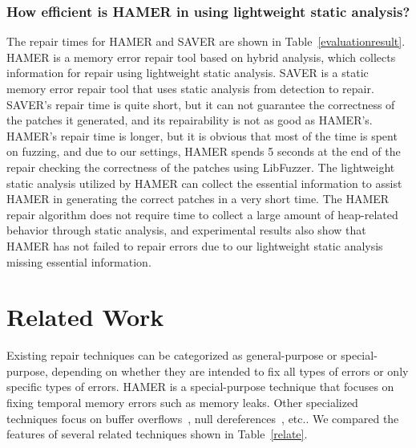 \documentclass[a4paper,11pt,oneside,openany]{book}
\begin{document}
\subsection[Research Question 3]{How efficient is HAMER in using lightweight static analysis?}
The repair times for HAMER and SAVER are shown in Table~\ref{evaluationresult}. HAMER is a memory error repair tool based on hybrid analysis, which collects information for repair using lightweight static analysis. SAVER is a static memory error repair tool that uses static analysis from detection to repair. SAVER's repair time is quite short, but it can not guarantee the correctness of the patches it generated, and its repairability is not as good as HAMER's. HAMER's repair time is longer, but it is obvious that most of the time is spent on fuzzing, and due to our settings, HAMER spends 5 seconds at the end of the repair checking the correctness of the patches using LibFuzzer. The lightweight static analysis utilized by HAMER can collect the essential information to assist HAMER in generating the correct patches in a very short time. The HAMER repair algorithm does not require time to collect a large amount of heap-related behavior through static analysis, and experimental results also show that HAMER has not failed to repair errors due to our lightweight static analysis missing essential information.

\vspace{0.4cm}
\hspace{-0.7cm}

\chapter{Related Work}
Existing repair techniques can be categorized as general-purpose or special-purpose, depending on whether they are intended to fix all types of errors or only specific types of errors. HAMER is a special-purpose technique that focuses on fixing temporal memory errors such as memory leaks. Other specialized techniques focus on buffer overflows~\cite{buffer}, null dereferences~\cite{Getafix,npe}, etc.. We compared the features of several related techniques shown in Table~\ref{relate}.
\end{document}
